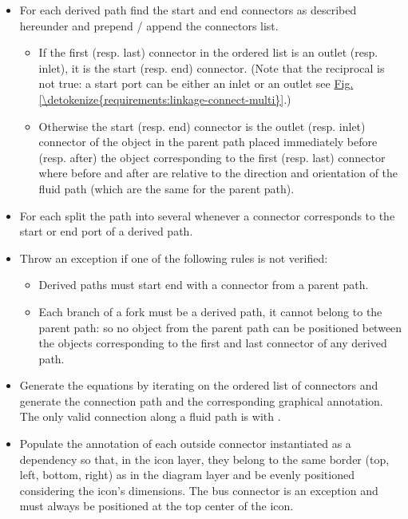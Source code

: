 \documentclass[letterpaper,10pt, openany,english]{sphinxmanual}
\begin{document}
\begin{itemize}
\begin{itemize}
\item {} 
For each derived path find the start and end connectors as described hereunder and prepend / append the connectors list.
\begin{itemize}
\item {} 
If the first (resp. last) connector in the ordered list is an outlet (resp. inlet), it is the start (resp. end) connector. (Note that the reciprocal is not true: a start port can be either an inlet or an outlet see \hyperref[\detokenize{requirements:linkage-connect-multi}]{Fig.\@ \ref{\detokenize{requirements:linkage-connect-multi}}}.)

\item {} 
Otherwise the start (resp. end) connector is the outlet (resp. inlet) connector of the object in the parent path placed immediately before (resp. after) the object corresponding to the first (resp. last) connector \textendash{} where before and after are relative to the direction and orientation of the fluid path (which are the same for the parent path).

\end{itemize}

\item {} 
For each  split the path into several  whenever a connector corresponds to the start or end port of a derived path.

\item {} 
Throw an exception if one of the following rules is not verified:
\begin{itemize}
\item {} 
Derived paths must start  end with a connector from a parent path.

\item {} 
Each branch of a fork must be a derived path, it cannot belong to the parent path: so no object from the parent path can be positioned between the objects corresponding to the first and last connector of any derived path.

\end{itemize}

\item {} 
Generate the  equations by iterating on the ordered list of connectors and generate the connection path and the corresponding graphical annotation. The only valid connection along a fluid path is  with .

\item {} 
Populate the  annotation of each outside connector instantiated as a dependency so that, in the icon layer, they belong to the same border (top, left, bottom, right) as in the diagram layer and be evenly positioned considering the icon’s dimensions. The bus connector is an exception and must always be positioned at the top center of the icon.

\end{itemize}

\end{itemize}
\end{document}
